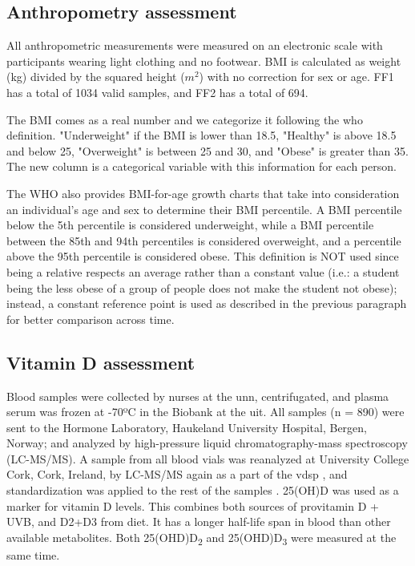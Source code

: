 \subsection{Anthropometry assessment}
 
All anthropometric measurements were measured on an electronic scale with participants wearing light clothing and no footwear. BMI is calculated as weight (kg) divided by the squared height ($m^2$) with no correction for sex or age. FF1 has a total of 1034 valid samples, and FF2 has a total of 694.

The BMI comes as a real number and we categorize it following the \gls{who} definition\cite{whoBMI}. "Underweight" if the BMI is lower than 18.5, "Healthy" is above 18.5 and below 25, "Overweight" is between 25 and 30, and "Obese" is greater than 35. The new column is a categorical variable with this information for each person.
  
The WHO also provides BMI-for-age growth charts that take into consideration an individual’s age and sex to determine their BMI percentile. A BMI percentile below the 5th percentile is considered underweight, while a BMI percentile between the 85th and 94th percentiles is considered overweight, and a percentile above the 95th percentile is considered obese. This definition is NOT used since being a relative respects an average rather than a constant value (i.e.: a student being the less obese of a group of people does not make the student not obese); instead, a constant reference point is used as described in the previous paragraph for better comparison across time.


\subsection{Vitamin D assessment}

Blood samples were collected by nurses at the \gls{unn}, centrifugated, and plasma serum was frozen at -70ºC in the Biobank at the \gls{uit}. All samples (n = 890) were sent to the Hormone Laboratory, Haukeland University Hospital, Bergen, Norway; and analyzed by high-pressure liquid chromatography-mass spectroscopy (LC-MS/MS). A sample from all blood vials was reanalyzed at University College Cork, Cork, Ireland, by LC-MS/MS again as a part of the \gls{vdsp} \cite{vdspreference}, and standardization was applied to the rest of the samples \cite{Cashman2015}. 25(OH)D was used as a marker for vitamin D levels. This combines both sources of provitamin D + UVB, and D2+D3 from diet. It has a longer half-life span in blood than other available metabolites. Both 25(OHD)D\textsubscript{2} and 25(OHD)D\textsubscript{3} were measured at the same time. 

